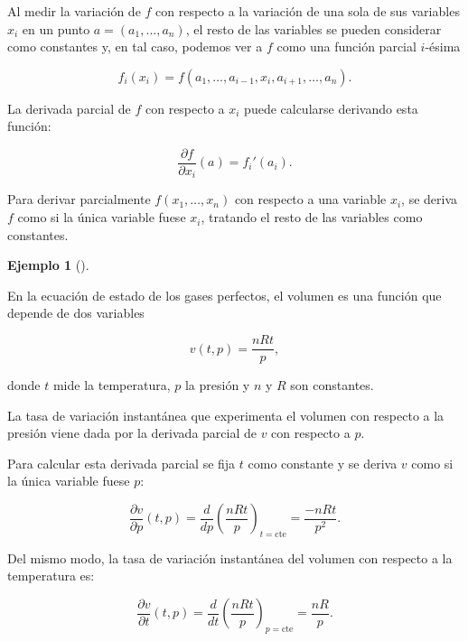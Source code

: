 \documentclass[
  a4paper,
]{scrreport}
\theoremstyle{plain}
\theoremstyle{plain}
\theoremstyle{definition}
\theoremstyle{definition}
\newtheorem{example}{Ejemplo}[chapter]
\theoremstyle{plain}
\theoremstyle{definition}
\theoremstyle{remark}
\begin{document}
Al medir la variación de \(f\) con respecto a la variación de una sola
de sus variables \(x_i\) en un punto \(a=(a_1,\ldots,a_n)\), el resto de
las variables se pueden considerar como constantes y, en tal caso,
podemos ver a \(f\) como una función parcial \(i\)-ésima

\[
f_i(x_i)=f(a_1,\ldots,a_{i-1},x_i,a_{i+1},\ldots,a_n).
\]

La derivada parcial de \(f\) con respecto a \(x_i\) puede calcularse
derivando esta función:

\[
\frac{\partial f}{\partial x_i}(a)=f_i'(a_i).
\]

\begin{tcolorbox}[enhanced jigsaw, rightrule=.15mm, toptitle=1mm, colbacktitle=quarto-callout-important-color!10!white, bottomrule=.15mm, opacityback=0, arc=.35mm, breakable, toprule=.15mm, left=2mm, coltitle=black, colback=white, opacitybacktitle=0.6, titlerule=0mm, colframe=quarto-callout-important-color-frame, bottomtitle=1mm, title=\textcolor{quarto-callout-important-color}{\faExclamation}\hspace{0.5em}{Regla}, leftrule=.75mm]

Para derivar parcialmente \(f(x_1,\ldots,x_n)\) con respecto a una
variable \(x_i\), se deriva \(f\) como si la única variable fuese
\(x_i\), tratando el resto de las variables como constantes.

\end{tcolorbox}

\begin{example}[]\protect\hypertarget{exm-calculo-derivada-parcial}{}\label{exm-calculo-derivada-parcial}

En la ecuación de estado de los gases perfectos, el volumen es una
función que depende de dos variables

\[
v(t,p)=\frac{nRt}{p},
\]

donde \(t\) mide la temperatura, \(p\) la presión y \(n\) y \(R\) son
constantes.

La tasa de variación instantánea que experimenta el volumen con respecto
a la presión viene dada por la derivada parcial de \(v\) con respecto a
\(p\).

Para calcular esta derivada parcial se fija \(t\) como constante y se
deriva \(v\) como si la única variable fuese \(p\):

\[
\frac{\partial v}{\partial p}(t,p)=\frac{d}{dp}\left(\frac{nRt}{p}\right)_{\mbox{$t=$cte}}=\frac{-nRt}{p^2}.
\]

Del mismo modo, la tasa de variación instantánea del volumen con
respecto a la temperatura es:

\[
\frac{\partial v}{\partial t}(t,p)=\frac{d}{dt}\left(\frac{nRt}{p}\right)_{\mbox{$p=$cte}}=\frac{nR}{p}.
\]

\end{example}
\end{document}
